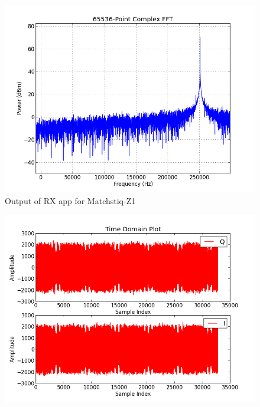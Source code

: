 \documentclass{article}
\begin{document}
        \begin{figure}[h]
                \centering
                \includegraphics[scale=.5]{rx_app_sig_gen_fft}
                \caption{Output of RX app for Matchstiq-Z1}
                \label{fig:rx_app_sig_gen_fft}
        \end{figure}
\pagebreak
        \begin{figure}[h]
                \centering
                \includegraphics[scale=.5]{rx_app_sig_gen_time_domain_zed_zipper}
                \label{fig:rx_app_sig_gen_time_domain_zed_zipper}
        \end{figure}
\end{document}
